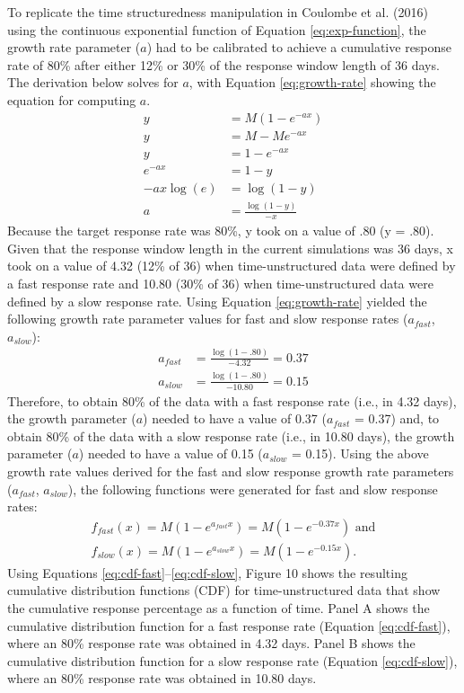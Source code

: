 \documentclass[
12pt, %
twoside,
english]{guelphthesis}
\begin{document}
To replicate the time structuredness manipulation in Coulombe et al. (2016) using the continuous exponential function of Equation \ref{eq:exp-function}, the growth rate parameter (\(a\)) had to be calibrated to achieve a cumulative response rate of 80\% after either 12\% or 30\% of the response window length of 36 days. The derivation below solves for \(a\), with Equation \ref{eq:growth-rate} showing the equation for computing \(a\).
\begin{align}
y  &= M(1 - e^{-ax}) \nonumber \\
y &= M - Me^{-ax} \nonumber \\
y &= 1 -e^{-ax} \nonumber \\
e^{-ax} &= 1-y \nonumber \\
-ax\log(e) &= \log(1 - y) \nonumber \\
a &= \frac{\log(1 - y)}{-x}
\label{eq:growth-rate}
\end{align}
\noindent Because the target response rate was 80\%, y took on a value of .80 (y = .80). Given that the response window length in the current simulations was 36 days, x took on a value of 4.32 (12\% of 36) when time-unstructured data were defined by a fast response rate and 10.80 (30\% of 36) when time-unstructured data were defined by a slow response rate. Using Equation \ref{eq:growth-rate} yielded the following growth rate parameter values for fast and slow response rates (\(a_{fast}\), \(a_{slow}\)):
\begin{align}
a_{fast} &= \frac{\log(1 - .80)}{-4.32} = 0.37 \nonumber \\
a_{slow} &= \frac{\log(1 - .80)}{-10.80} = 0.15 \nonumber
\end{align}
\noindent Therefore, to obtain 80\% of the data with a fast response rate (i.e., in 4.32 days), the growth parameter (\(a\)) needed to have a value of 0.37 (\(a_{fast}\) = 0.37) and, to obtain 80\% of the data with a slow response rate (i.e., in 10.80 days), the growth parameter (\(a\)) needed to have a value of 0.15 (\(a_{slow}\) = 0.15). Using the above growth rate values derived for the fast and slow response growth rate parameters (\(a_{fast}\), \(a_{slow}\)), the following functions were generated for fast and slow response rates:
\begin{align}
f_{fast}(x) = M(1 - e^{a_{fast}x}) = M(1 - e^{-0.37x}) \text{ and} \label{eq:cdf-fast}\\
f_{slow}(x) = M(1 - e^{a_{slow}x}) = M(1 - e^{-0.15x}).\label{eq:cdf-slow}
\end{align}
\noindent Using Equations \ref{eq:cdf-fast}--\ref{eq:cdf-slow}, Figure 10 shows the resulting cumulative distribution functions (CDF) for time-unstructured data that show the cumulative response percentage as a function of time. Panel A shows the cumulative distribution function for a fast response rate (Equation \ref{eq:cdf-fast}), where an 80\% response rate was obtained in 4.32 days. Panel B shows the cumulative distribution function for a slow response rate (Equation \ref{eq:cdf-slow}), where an 80\% response rate was obtained in 10.80 days.
\end{document}
